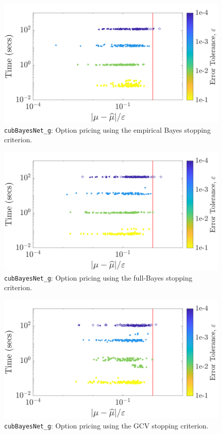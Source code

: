 \documentclass{iitthesis}          %
\newcommand{\code}[1]{\texttt{#1}}
\begin{document}
{{{{{{\begin{figure}
	\centering
	\includegraphics[width=0.95\linewidth]{"Sobol/Sobol_optPrice_guaranteed_time_MLE__d12_r1_2019-Jun-13"}
	\caption[Sobol: Option pricing guaranteed: MLE]{\code{cubBayesNet\_g}: Option pricing using the empirical Bayes stopping criterion.}
	\label{fig:Sobol-optprice-guaranteed-MLE}
\end{figure}
\begin{figure}
	\centering
	\includegraphics[width=0.95\linewidth]{"Sobol/Sobol_optPrice_guaranteed_time_full__d12_r1_2019-Jun-13"}
	\caption[Sobol: Option pricing guaranteed: Full Bayes]{\code{cubBayesNet\_g}: Option pricing using the full-Bayes stopping criterion.}
	\label{fig:Sobol-optprice-guaranteed-FB}
\end{figure}
\begin{figure}
	\centering
	\includegraphics[width=0.95\linewidth]{"Sobol/Sobol_optPrice_guaranteed_time_GCV__d12_r1_2019-Jun-13"}
	\caption[Sobol: Option pricing guaranteed: GCV]{\code{cubBayesNet\_g}: Option pricing using the GCV stopping criterion.}
	\label{fig:Sobol-optprice-guaranteed-GCV}
\end{figure}




}}}}}}
\end{document}
